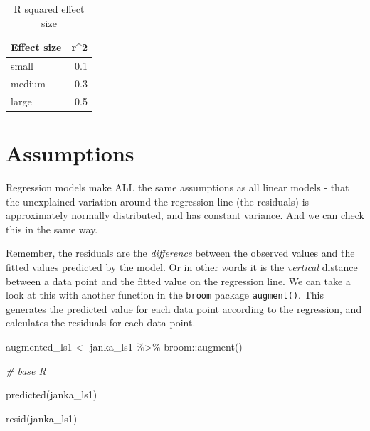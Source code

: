 \documentclass[
]{book}
\newenvironment{Shaded}{\begin{snugshade}}{\end{snugshade}}
\newcommand{\CommentTok}[1]{\textcolor[rgb]{0.56,0.35,0.01}{\textit{#1}}}
\newcommand{\FunctionTok}[1]{\textcolor[rgb]{0.00,0.00,0.00}{#1}}
\newcommand{\NormalTok}[1]{#1}
\newcommand{\OtherTok}[1]{\textcolor[rgb]{0.56,0.35,0.01}{#1}}
\newcommand{\SpecialCharTok}[1]{\textcolor[rgb]{0.00,0.00,0.00}{#1}}
\begin{document}
\begin{table}

\caption{\label{tab:unnamed-chunk-437}R squared effect size}
\begin{tabular}[t]{l|r}
\hline
Effect size & r\textasciicircum{}2\\
\hline
small & 0.1\\
\hline
medium & 0.3\\
\hline
large & 0.5\\
\hline
\end{tabular}
\end{table}

\hypertarget{assumptions}{%
\section{Assumptions}\label{assumptions}}

Regression models make ALL the same assumptions as all linear models - that the unexplained variation around the regression line (the residuals) is approximately normally distributed, and has constant variance. And we can check this in the same way.

Remember, the residuals are the \emph{difference} between the observed values and the fitted values predicted by the model. Or in other words it is the \emph{vertical} distance between a data point and the fitted value on the regression line. We can take a look at this with another function in the \texttt{broom} package \texttt{augment()}. This generates the predicted value for each data point according to the regression, and calculates the residuals for each data point.

\begin{Shaded}
\begin{Highlighting}[]
\NormalTok{augmented\_ls1 }\OtherTok{\textless{}{-}}\NormalTok{ janka\_ls1 }\SpecialCharTok{\%\textgreater{}\%} 
\NormalTok{  broom}\SpecialCharTok{::}\FunctionTok{augment}\NormalTok{()}
\end{Highlighting}
\end{Shaded}

\begin{Shaded}
\begin{Highlighting}[]
\CommentTok{\# base R}

\FunctionTok{predicted}\NormalTok{(janka\_ls1)}

\FunctionTok{resid}\NormalTok{(janka\_ls1)}
\end{Highlighting}
\end{Shaded}
\end{document}
